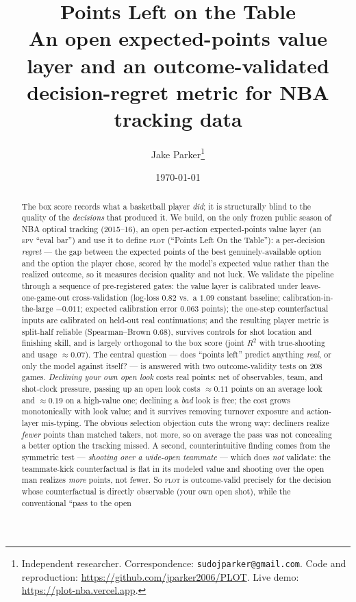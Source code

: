\documentclass[11pt]{article}
\title{\textbf{Points Left on the Table}\\[2pt]
\large An open expected-points value layer and an outcome-validated\\
decision-regret metric for NBA tracking data}
\author{Jake Parker\thanks{Independent researcher. Correspondence: \texttt{sudojparker@gmail.com}.
Code and reproduction: \url{https://github.com/jparker2006/PLOT}. Live demo:
\url{https://plot-nba.vercel.app}.}}
\date{\today}
\newcommand{\plot}{\textsc{plot}}
\newcommand{\epv}{\textsc{epv}}
\begin{document}
\maketitle

\begin{abstract}
The box score records what a basketball player \emph{did}; it is structurally blind to the quality of
the \emph{decisions} that produced it. We build, on the only frozen public season of NBA optical
tracking (2015--16), an open per-action expected-points value layer (an \epv{} ``eval bar'') and use
it to define \plot{} (``Points Left On the Table''): a per-decision \emph{regret} --- the gap between
the expected points of the best genuinely-available option and the option the player chose, scored by
the model's expected value rather than the realized outcome, so it measures decision quality and not
luck. We validate the pipeline through a sequence of pre-registered gates: the value layer is
calibrated under leave-one-game-out cross-validation (log-loss $0.82$ vs.\ a $1.09$ constant baseline;
calibration-in-the-large $-0.011$; expected calibration error $0.063$ points); the one-step
counterfactual inputs are calibrated on held-out real continuations; and the resulting player metric
is split-half reliable (Spearman--Brown $0.68$), survives controls for shot location and finishing
skill, and is largely orthogonal to the box score (joint $R^2$ with true-shooting and usage $\approx0.07$).
The central question --- does ``points left'' predict anything \emph{real}, or only the model against
itself? --- is answered with two outcome-validity tests on 208 games. \emph{Declining your own open
look} costs real points: net of observables, team, and shot-clock pressure, passing up an open look
costs $\approx\!0.11$ points on an average look and $\approx\!0.19$ on a high-value one; declining a
\emph{bad} look is free; the cost grows monotonically with look value; and it survives removing
turnover exposure and action-layer mis-typing. The obvious selection objection cuts the wrong way:
decliners realize \emph{fewer} points than matched takers, not more, so on average the pass was not
concealing a better option the tracking missed. A second, counterintuitive finding comes from the
symmetric test --- \emph{shooting over a wide-open teammate} --- which does \emph{not} validate: the
teammate-kick counterfactual is flat in its modeled value and shooting over the open man realizes
\emph{more} points, not fewer. So \plot{} is outcome-valid precisely for the decision whose
counterfactual is directly observable (your own open shot), while the conventional ``pass to the open

\end{abstract}
\end{document}
